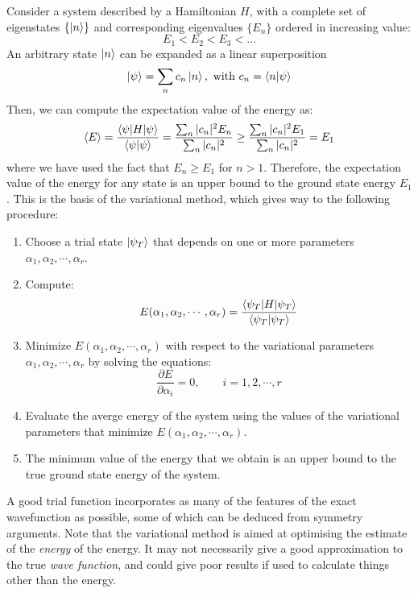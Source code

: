 Consider a system described by a Hamiltonian $H$, with a complete set of eigenstates $\{\ket{n}\}$ and corresponding eigenvalues $\{E_n\}$ ordered in increasing value:
\begin{equation}
    E_1 < E_2 < E_3 < \dots
\end{equation}
An arbitrary state $\ket{n}$ can be expanded as a linear superposition
\begin{equation}
    \ket{\psi} = \sum_n c_n\ket{n},\text{ with }c_n = \braket{n|\psi}
\end{equation}
Then, we can compute the expectation value of the energy as:
\begin{equation}
    \braket{E} = \frac{\braket{\psi|H|\psi}}{\braket{\psi|\psi}} = \frac{\sum_n |c_n|^2 E_n }{\sum_n |c_n|^2} \geq \frac{\sum_n |c_n|^2 E_1 }{\sum_n |c_n|^2} = E_1
\end{equation}
where we have used the fact that $E_n \geq E_1$ for $n>1$. Therefore, the expectation value of the energy for any state is an upper bound to the ground state energy $E_1$. This is the basis of the variational method, which gives way to the following procedure:
\begin{enumerate}
    \item Choose a trial state $\ket{\psi_T}$ that depends on one or more parameters $\alpha_1, \alpha_2, \cdots, \alpha_r$.
    \item Compute:
    \begin{equation}
        E (\alpha_1, \alpha_2, \cdots, \alpha_r) = \frac{\braket{\psi_T|H|\psi_T}}{\braket{\psi_T|\psi_T}}
    \end{equation}
    \item Minimize $E (\alpha_1, \alpha_2, \cdots, \alpha_r)$ with respect to the variational parameters $\alpha_1, \alpha_2, \cdots, \alpha_r$ by solving the equations:
    \begin{equation}
        \frac{\partial E}{\partial \alpha_i} = 0, \qquad i = 1, 2, \cdots, r
    \end{equation}
    \item Evaluate the averge energy of the system using the values of the variational parameters that minimize $E (\alpha_1, \alpha_2, \cdots, \alpha_r)$.
    \item The minimum value of the energy that we obtain is an upper bound to the true ground state energy of the system.
\end{enumerate}

A good trial function incorporates as many of the features of the exact wavefunction as possible, some of which can be deduced from symmetry arguments. Note that the variational method is aimed at optimising the estimate of the \textit{energy} of the energy. It may not necessarily give a good approximation to the true \textit{wave function}, and could give poor results if used to calculate things other than the energy.


